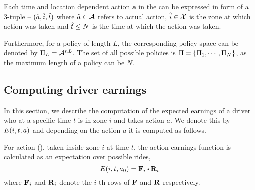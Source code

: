 Each time and location dependent action $\mathbf{a}$ in the {\policy} can be expressed in form of a 3-tuple -- $(\hat{a}, \hat{i}, \hat{t})$
where $\hat{a} \in \mathcal{A}$ refers to actual action, $\hat{i} \in \mathcal{X}$ is the zone at which action was taken and $\hat{t} \leq N$ is the 
time at which the action was taken.



Furthermore, for a policy of length $L$, the corresponding policy space can be denoted by
$\Pi_L = \mathcal{A}^{nL}$. The set of all possible policies is $\Pi = \{\Pi_1, \cdots, \Pi_N\}$, as the maximum length of a policy can be $N$.


\subsection{Computing driver earnings}
In this section, we describe the computation of the expected earnings of a driver
who at a specific time $t$ is in zone $i$ and takes action $a$. We denote this by 
$E({i},{t},{a})$ and depending on the action $a$ it is computed as follows.

\squishlist
	\item For action {\getpassengeraction} ({\getpassenger}), taken inside zone $i$ at time $t$, the action earnings function
	is calculated as an expectation over possible rides,
	\begin{equation}\label{eq:a0}
	\actionearning{i}{t}{a_0} = \empiricaltransitionmatrix_{i}\bigcdot \rewardsmatrix_{i}
	\end{equation}
	where ${\mathbf{F}}_{i}$ and ${\mathbf{R}}_{i}$ denote the $i$-th rows of ${\mathbf{F}}$ and ${\mathbf{R}}$ respectively. 
	
